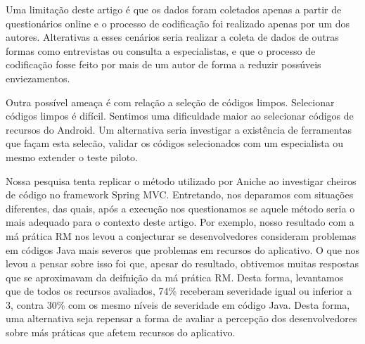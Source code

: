 Uma limitação deste artigo é que os dados foram coletados apenas a partir de questionários online e o processo de codificação foi realizado apenas por um dos autores. Alterativas a esses cenários seria realizar a coleta de dados de outras formas como entrevistas ou consulta a especialistas, e que o processo de codificação fosse feito por mais de um autor de forma a reduzir possúveis enviezamentos.

Outra possível ameaça é com relação a seleção de códigos limpos. Selecionar códigos limpos é difícil. Sentimos uma dificuldade maior ao selecionar códigos de recursos do Android. Um alternativa seria investigar a existência de ferramentas que façam esta selecão, validar os códigos selecionados com um especialista ou mesmo extender o teste piloto. 

Nossa pesquisa tenta replicar o método utilizado por Aniche \cite{FinavaroAniche2016} ao investigar cheiros de código no framework Spring MVC. Entretando, nos deparamos com situações diferentes, das quais, após a execução nos questionamos se aquele método seria o mais adequado para o contexto deste artigo. Por exemplo, nosso resultado com a má prática RM nos levou a conjecturar se desenvolvedores consideram problemas em códigos Java mais severos que problemas em recursos do aplicativo. O que nos levou a pensar sobre isso foi que, apesar do resultado, obtivemos muitas respostas que se aproximavam da deifnição da má prática RM. Desta forma, levantamos que de todos os recursos avaliados, 74\% receberam severidade igual ou inferior a 3, contra 30\% com os mesmo níveis de severidade em código Java. Desta forma, uma alternativa seja repensar a forma de avaliar a percepção dos desenvolvedores sobre más práticas que afetem recursos do aplicativo.

